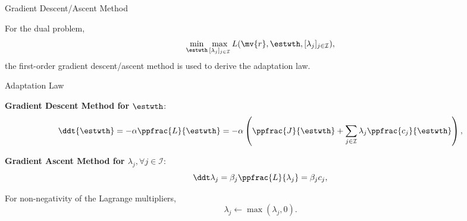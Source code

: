 \documentclass[8pt, aspectratio=169]{beamer}
\begin{document}
\begin{frame}{\insertsubsectionhead}{Gradient Descent/Ascent Method}
  
  For the dual problem, 
  \begin{equation}
    \min_{\estwth}\max_{[\lambda_j]_{j\in\mathcal{I}}} 
    L(\mv{r},\estwth,[\lambda_j]_{j\in\mathcal{I}})
    ,
  \end{equation}
  the first-order gradient descent/ascent method is used to derive the adaptation law.

  \centering
  \begin{minipage}{0.6\textwidth}%

    \begin{block}{Adaptation Law}%
      
    \textbf{Gradient Descent Method for $\estwth$}:
    \begin{equation}\label{eq:adaptation_law:1}
      \ddt {{\estwth}}
      =
      -\alpha 
      \ppfrac{L}{{\estwth}}
      =-\alpha 
      \left(
          \ppfrac{J}{{\estwth}}
          +
          \sum_{j\in\mathcal{I}}
          \lambda_j 
          \ppfrac{c_j}{\estwth}
      \right),
    \end{equation}

    \textbf{Gradient Ascent Method for $\lambda_j, \forall j\in\mathcal I$}:
    \begin{equation}\label{eq:adaptation_law:2}
      \ddt\lambda_j
      = 
      \beta_j
      \ppfrac{L}{\lambda_j} 
      = 
      \beta_j c_j ,
    \end{equation}

    For non-negativity of the Lagrange multipliers,
    \begin{equation}\label{eq:adaptation_law:3}
      \lambda_j
      \leftarrow
      \max(\lambda_j,0)
      .
    \end{equation}


    \end{block}
  \end{minipage}
\end{frame}
\end{document}
